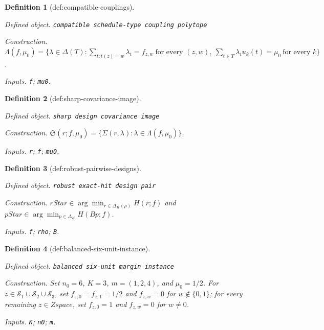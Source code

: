 \documentclass{article}
\newtheorem{definition}{Definition}
\begin{document}
\begin{definition}[def:compatible-couplings]\label{def:compatible-couplings}
\par\smallskip\noindent\emph{Defined object.} \texttt{compatible schedule-\allowbreak{}type coupling polytope}
\par\smallskip\noindent\emph{Construction.} \(\Lambda(f,\mu_0)=\{\lambda\in\Delta(T):\sum_{t:t(z)=w}\lambda_t=f_{z,w}\ \text{for every }(z,w),\ \sum_{t\in T}\lambda_tu_k(t)=\mu_0\ \text{for every }k\}\).
\par\smallskip\noindent\emph{Inputs.} \texttt{f}; \texttt{mu0}.
\end{definition}

\begin{definition}[def:sharp-covariance-image]\label{def:sharp-covariance-image}
\par\smallskip\noindent\emph{Defined object.} \texttt{sharp design covariance image}
\par\smallskip\noindent\emph{Construction.} \(\mathfrak S(r;f,\mu_0)=\{\Sigma(r,\lambda):\lambda\in\Lambda(f,\mu_0)\}\).
\par\smallskip\noindent\emph{Inputs.} \texttt{r}; \texttt{f}; \texttt{mu0}.
\end{definition}

\begin{definition}[def:robust-pairwise-designs]\label{def:robust-pairwise-designs}
\par\smallskip\noindent\emph{Defined object.} \texttt{robust exact-\allowbreak{}hit design pair}
\par\smallskip\noindent\emph{Construction.} \(rStar\in\arg\min_{r\in\Delta_K(\rho)}H(r;f)\) and \(pStar\in\arg\min_{p\in\Delta_K}H(Bp;f)\).
\par\smallskip\noindent\emph{Inputs.} \texttt{f}; \texttt{rho}; \texttt{B}.
\end{definition}

\begin{definition}[def:balanced-six-unit-instance]\label{def:balanced-six-unit-instance}
\par\smallskip\noindent\emph{Defined object.} \texttt{balanced six-\allowbreak{}unit margin instance}
\par\smallskip\noindent\emph{Construction.} Set \(n_0=6\), \(K=3\), \(m=(1,2,4)\), and \(\mu_0=1/2\). For \(z\in\mathcal S_1\cup\mathcal S_2\cup\mathcal S_3\), set \(f_{z,0}=f_{z,1}=1/2\) and \(f_{z,w}=0\) for \(w\notin\{0,1\}\); for every remaining \(z\in Zspace\), set \(f_{z,0}=1\) and \(f_{z,w}=0\) for \(w\ne0\).
\par\smallskip\noindent\emph{Inputs.} \texttt{K}; \texttt{n0}; \texttt{m}.
\end{definition}
\end{document}
